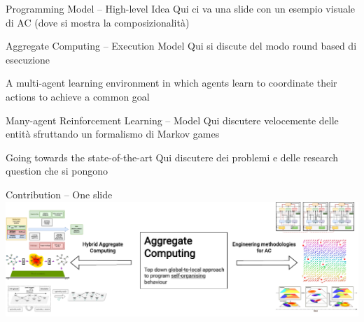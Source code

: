 \documentclass[presentation, 9pt]{beamer}\mode<presentation>{\usetheme{AMSBolognaFC}}
\begin{document}
\begin{frame}{Programming Model -- High-level Idea}
  Qui ci va una slide con un esempio visuale di AC (dove si mostra la composizionalità)
\end{frame}
\begin{frame}{Aggregate Computing -- Execution Model}
Qui si discute del modo round based di esecuzione
\end{frame}
\begin{frame}[plain]
  \begin{center}
\huge{}
  \end{center}
  \begin{center}
    \large{A multi-agent learning environment in which agents learn to coordinate their actions to achieve a common goal}
  \end{center}
\end{frame} 
\begin{frame}{Many-agent Reinforcement Learning -- Model}
Qui discutere velocemente delle entità sfruttando un formalismo di Markov games
\end{frame}
\begin{frame}{Going towards the state-of-the-art}
Qui discutere dei problemi e delle research question che si pongono
\end{frame}
\begin{frame}{Contribution -- One slide}
\\[0.5cm]
\includegraphics[width=\textwidth]{img/contribution.drawio.pdf}
\end{frame}
\end{document}
